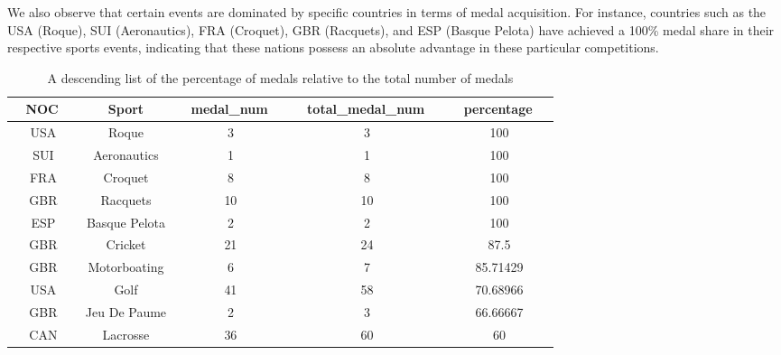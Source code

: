\documentclass{mcmthesis}
\begin{document}
We also observe that certain events are dominated by specific countries in terms of medal acquisition. For instance, countries such as the USA (Roque), SUI (Aeronautics), FRA (Croquet), GBR (Racquets), and ESP (Basque Pelota) have achieved a 100\% medal share in their respective sports events, indicating that these nations possess an absolute advantage in these particular competitions.

\begin{table}[H]
\centering
\caption{A descending list of the percentage of medals relative to the total number of medals}
\begin{tabular}{|c|c|c|c|c|} 
\hline
\textbf{~ NOC~~} & \textbf{Sport}        & \textbf{~ medal\_num~~} & \textbf{~ total\_medal\_num~~} & \textbf{~ percentage~~}  \\ 
\hline
USA              & Roque                 & 3                       & 3                              & 100                      \\ 
\hline
SUI              & Aeronautics           & 1                       & 1                              & 100                      \\ 
\hline
FRA              & Croquet               & 8                       & 8                              & 100                      \\ 
\hline
GBR              & Racquets              & 10                      & 10                             & 100                      \\ 
\hline
ESP              & Basque Pelota         & 2                       & 2                              & 100                      \\ 
\hline
GBR              & Cricket               & 21                      & 24                             & 87.5                     \\ 
\hline
GBR              & Motorboating          & 6                       & 7                              & 85.71429                 \\ 
\hline
USA              & Golf                  & 41                      & 58                             & 70.68966                 \\ 
\hline
GBR              & Jeu De Paume          & 2                       & 3                              & 66.66667                 \\ 
\hline
CAN              & Lacrosse              & 36                      & 60                             & 60                       \\ 

\end{tabular}
\end{table}
\end{document}
